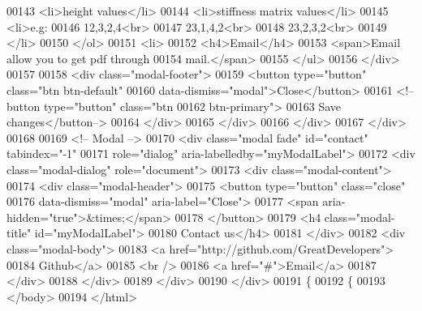 \begin{DoxyCode}
00143                                    <li>height values</li>
00144                                    <li>stiffness matrix values</li>
00145                                     <li>e.g:
00146                                         12,3,2,4<br>
00147                                        23,1,4,2<br>
00148                                         23,2,3,2<br>
00149                                     </li>
00150                                 </ol>
00151                             <li>
00152                                 <h4>Email</h4>
00153                                 <span>Email allow you to get pdf through
00154                                     mail.</span>
00155                         </ul>
00156                     </div>
00157 
00158                     <div class="modal-footer">
00159                         <button type="button" class="btn btn-default"
00160                             data-dismiss="modal">Close</button>
00161                             <!--button type="button" class="btn 
00162                             btn-primary">
00163                             Save changes</button-->
00164                     </div>
00165                 </div>
00166             </div>
00167         </div>
00168 
00169         <!-- Modal -->
00170         <div class="modal fade" id="contact" tabindex="-1"
00171             role="dialog" aria-labelledby="myModalLabel">
00172             <div class="modal-dialog" role="document">
00173                 <div class="modal-content">
00174                     <div class="modal-header">
00175                         <button type="button" class="close"
00176                             data-dismiss="modal" aria-label="Close">
00177                             <span aria-hidden="true">&times;</span>
00178                         </button>
00179                         <h4 class="modal-title" id="myModalLabel">
00180                             Contact us</h4>
00181                     </div>
00182                     <div class="modal-body">
00183                         <a href="http://github.com/GreatDevelopers">
00184                             Github</a>
00185                         <br />
00186                         <a href="#">Email</a>
00187                     </div>
00188                 </div>
00189             </div>
00190         </div>
00191         \{%
00192         \{%
00193     </body>
00194 </html>
\end{DoxyCode}
